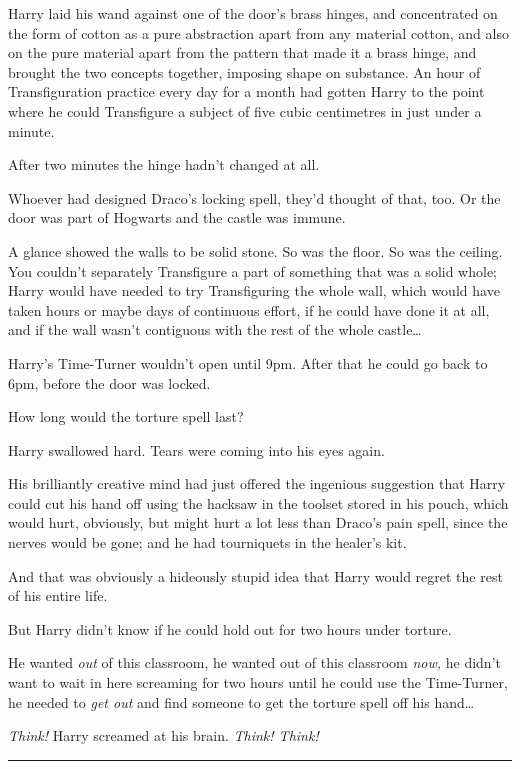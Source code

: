 Harry laid his wand against one of the door's brass hinges, and
concentrated on the form of cotton as a pure abstraction apart from any
material cotton, and also on the pure material apart from the pattern
that made it a brass hinge, and brought the two concepts together,
imposing shape on substance. An hour of Transfiguration practice every
day for a month had gotten Harry to the point where he could Transfigure
a subject of five cubic centimetres in just under a minute.

After two minutes the hinge hadn't changed at all.

Whoever had designed Draco's locking spell, they'd thought of that, too.
Or the door was part of Hogwarts and the castle was immune.

A glance showed the walls to be solid stone. So was the floor. So was
the ceiling. You couldn't separately Transfigure a part of something
that was a solid whole; Harry would have needed to try Transfiguring the
whole wall, which would have taken hours or maybe days of continuous
effort, if he could have done it at all, and if the wall wasn't
contiguous with the rest of the whole castle\ldots{}

Harry's Time-Turner wouldn't open until 9pm. After that he could go back
to 6pm, before the door was locked.

How long would the torture spell last?

Harry swallowed hard. Tears were coming into his eyes again.

His brilliantly creative mind had just offered the ingenious suggestion
that Harry could cut his hand off using the hacksaw in the toolset
stored in his pouch, which would hurt, obviously, but might hurt a lot
less than Draco's pain spell, since the nerves would be gone; and he had
tourniquets in the healer's kit.

And that was obviously a hideously stupid idea that Harry would regret
the rest of his entire life.

But Harry didn't know if he could hold out for two hours under torture.

He wanted \emph{out} of this classroom, he wanted out of this classroom
\emph{now,} he didn't want to wait in here screaming for two hours until
he could use the Time-Turner, he needed to \emph{get out} and find
someone to get the torture spell off his hand\ldots{}

\emph{Think!} Harry screamed at his brain. \emph{Think! Think!}

\begin{center}\rule{3in}{0.4pt}\end{center}

